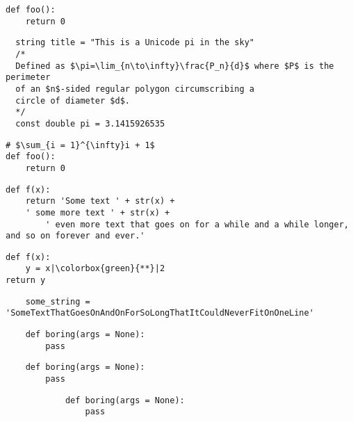\documentclass{article}
\begin{document}
\begin{verbatim}
def foo():
    return 0
\end{verbatim}

\begin{verbatim}
  string title = "This is a Unicode pi in the sky"
  /*
  Defined as $\pi=\lim_{n\to\infty}\frac{P_n}{d}$ where $P$ is the perimeter
  of an $n$-sided regular polygon circumscribing a
  circle of diameter $d$.
  */
  const double pi = 3.1415926535
\end{verbatim}
  
\begin{verbatim}
# $\sum_{i = 1}^{\infty}i + 1$
def foo():
    return 0
\end{verbatim}
  
\begin{verbatim}
def f(x):
    return 'Some text ' + str(x) + 
    ' some more text ' + str(x) + 
        ' even more text that goes on for a while and a while longer, and so on forever and ever.'
\end{verbatim}
  
\begin{verbatim}
def f(x):
    y = x|\colorbox{green}{**}|2
return y
\end{verbatim}

\begin{verbatim}
    some_string = 'SomeTextThatGoesOnAndOnForSoLongThatItCouldNeverFitOnOneLine'
\end{verbatim}


\begin{verbatim}
    def boring(args = None):
        pass
\end{verbatim}

\begin{verbatim}
    def boring(args = None):
        pass
\end{verbatim}

\begin{verbatim}
            def boring(args = None):
                pass
\end{verbatim}
\end{document}
